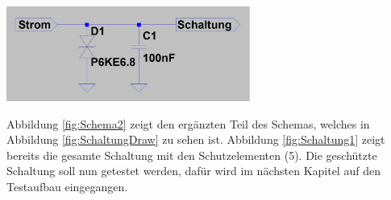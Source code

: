 \begin{minipage}[b][4.75cm][t]{1\textwidth}
\centering
\includegraphics[angle=0,width=0.6\textwidth]{graphics/Schema2.jpg}
\label{fig:Schema2}
\end{minipage}
Abbildung \ref{fig:Schema2} zeigt den ergänzten Teil des Schemas, welches in Abbildung \ref{fig:SchaltungDraw} zu sehen ist. Abbildung \ref{fig:Schaltung1} zeigt bereits die gesamte Schaltung mit den Schutzelementen (5). Die geschützte Schaltung soll nun getestet werden, dafür wird im nächsten Kapitel auf den Testaufbau eingegangen.

